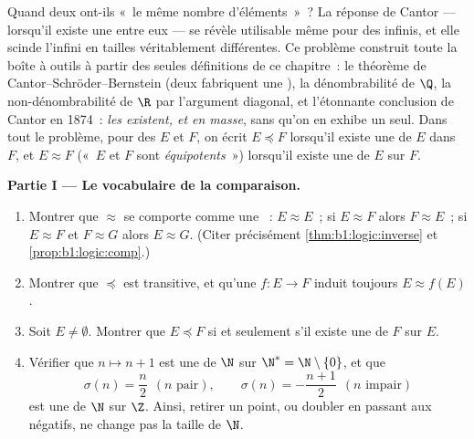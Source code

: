 \begin{problem}\label{pb:b1:logic:1}
Quand deux  ont-ils «~le même nombre d'éléments~»~? La réponse
de Cantor --- lorsqu'il existe une  entre eux --- se révèle
utilisable même pour des  infinis, et elle scinde l'infini en
tailles véritablement différentes. Ce problème construit toute la boîte
à outils à partir des seules définitions de ce chapitre~: le théorème de
Cantor--Schröder--Bernstein (deux  fabriquent une ),
la dénombrabilité de $\Q$, la non-dénombrabilité de $\R$ par l'argument
diagonal, et l'étonnante conclusion de Cantor en 1874~: \emph{les
 existent, et en masse}, sans qu'on en exhibe un
seul.
Dans tout le problème, pour des  $E$ et $F$, on écrit $E
\preceq F$ lorsqu'il existe une  de $E$ dans $F$, et $E
\approx F$ («~$E$ et $F$ sont \emph{équipotents}~») lorsqu'il existe une
 de $E$ sur $F$.

\medskip
\noindent\textbf{Partie I --- Le vocabulaire de la comparaison.}
\begin{enumerate}
  \item Montrer que $\approx$ se comporte comme une ~: $E \approx E$~; si $E \approx F$ alors
        $F \approx E$~; si $E \approx F$ et $F \approx G$ alors
        $E \approx G$. (Citer précisément \cref{thm:b1:logic:inverse} et
        \cref{prop:b1:logic:comp}.)
  \item Montrer que $\preceq$ est transitive, et qu'une 
        $f \colon E \to F$ induit toujours $E \approx f(E)$.
  \item Soit $E \neq \emptyset$. Montrer que $E \preceq F$ si et
        seulement s'il existe une  de $F$ sur $E$.
  \item Vérifier que $n \mapsto n + 1$ est une  de $\N$ sur
        $\N^* = \N \setminus \{0\}$, et que
        \[
        \sigma(n) = \frac n2 \ \ (n \text{ pair}), \qquad
        \sigma(n) = -\frac{n+1}2 \ \ (n \text{ impair})
        \]
        est une  de $\N$ sur $\Z$. Ainsi, retirer un point,
        ou doubler en passant aux négatifs, ne change pas la taille de
        $\N$.
\end{enumerate}


\end{problem}
